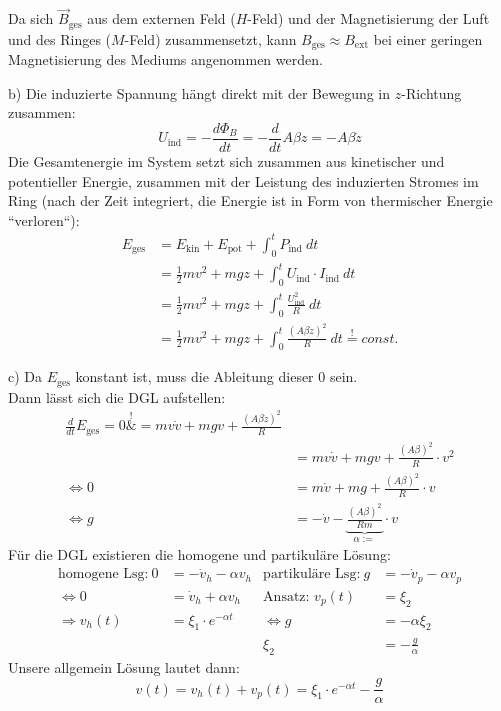 \documentclass[11pt a4paper]{article}
\begin{document}
Da sich $\vec B_\text{ges}$ aus dem externen Feld ($H$-Feld) und der
Magnetisierung der Luft und des Ringes ($M$-Feld) zusammensetzt,
kann $B_\text{ges} \approx B_\text{ext}$ bei einer geringen Magnetisierung
des Mediums angenommen werden.

\vspace{0.5cm}

b) Die induzierte Spannung hängt direkt mit der Bewegung in $z$-Richtung 
zusammen:
\[
	U_\text{ind} = -\frac{d\Phi_B}{dt}
	= -\frac{d}{dt} A \beta z
	= -A\beta \dot z
\]
Die Gesamtenergie im System setzt sich zusammen aus kinetischer und
potentieller Energie, zusammen mit der Leistung des induzierten Stromes
im Ring (nach der Zeit integriert, die Energie ist in Form von 
thermischer Energie ``verloren``):
\begin{align*}
	E_\text{ges} 
	&= E_\text{kin} + E_\text{pot} + \int_0^t P_\text{ind} \ dt \\
	&= \frac12 mv^2 + mgz 
	+ \int_0^t U_\text{ind} \cdot I_\text{ind} \ dt \\
	&= \frac12 mv^2 + mgz 
	+ \int_0^t \frac{U_\text{ind}^2} R \ dt \\
	&= \frac12 mv^2 + mgz 
	+ \int_0^t \frac{(A\beta \dot z)^2} R \ dt
	\overset != const.
\end{align*}

\vspace{0.5cm}

c) Da $E_\text{ges}$ konstant ist, muss die Ableitung dieser $0$ sein.\\
Dann lässt sich die DGL aufstellen:
\begin{align*}
	\frac{d}{dt} E_\text{ges} 
	= 0
	\overset{!}&{=}
	m v \dot v + mgv
	+ \frac{(A\beta \dot z)^2} R \\
	&= m v \dot v + mgv + \frac{(A\beta)^2} R \cdot v^2 \\
	\Leftrightarrow
	0
	&= m \dot v + mg + \frac{(A\beta)^2} R \cdot v \\
	\Leftrightarrow
	g
	&= - \dot v - \underbrace{\frac{(A\beta)^2}{Rm}}_{\alpha :=}
	\cdot v
\end{align*}
Für die DGL existieren die homogene und partikuläre Lösung:
\begin{align*}
	\text{homogene Lsg:} \ 
	0
	&= - \dot v_h - \alpha v_h
	&
	\text{partikuläre Lsg:} \ 
	g
	&= - \dot v_p - \alpha v_p \\
	\Leftrightarrow
	0
	&= \dot v_h + \alpha v_h
	&
	\text{Ansatz: } v_p(t) 
	&= \xi_2 \\
	\Rightarrow
	v_h(t) 
	&= \xi_1 \cdot e^{-\alpha t}
	&
	\Leftrightarrow
	g
	&=- \alpha \xi_2 \\
	&&
	\xi_2
	&= -\frac g\alpha
\end{align*}
Unsere allgemein Lösung lautet dann:
\[
	v(t) = v_h(t) + v_p(t) = \xi_1 \cdot e^{-\alpha t} -\frac g\alpha
\]
\end{document}
